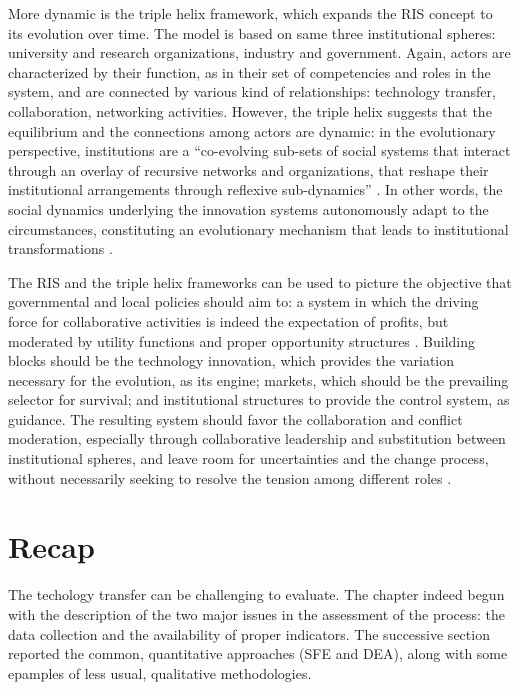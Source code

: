 More dynamic is the triple helix framework, which expands the RIS concept to its evolution over time. The model is based on same three  institutional spheres: university and research organizations, industry and government. Again, actors are characterized by their function, as in their set of competencies and roles in the system, and are connected by various kind of relationships: technology transfer, collaboration, networking activities. However, the triple helix suggests that the equilibrium and the connections among actors are dynamic: in the evolutionary perspective, institutions are a \enquote{co-evolving sub-sets of social systems that interact through an overlay of recursive networks and organizations, that reshape their institutional arrangements through reflexive sub-dynamics} \citep{Ranga2013}. In other words, the social dynamics underlying the innovation systems autonomously adapt to the circumstances, constituting an evolutionary mechanism that leads to institutional transformations \citep{Etzkowitz2000}.

The RIS and the triple helix frameworks can be used to picture the objective that governmental and local policies should aim to: a system in which the driving force for collaborative activities is indeed the expectation of profits, but moderated by utility functions and proper opportunity structures \citep{Etzkowitz2000}. Building blocks should be the technology innovation, which provides the variation necessary for the evolution, as its engine; markets, which should be the prevailing selector for survival; and institutional structures to provide the control system, as guidance. The resulting system should favor the collaboration and conflict moderation, especially through collaborative leadership and substitution between institutional spheres, and leave room for uncertainties and the change process, without necessarily seeking to resolve the tension among different roles \citep{Ranga2013}. 

\section{Recap}

The techology transfer can be challenging to evaluate. The chapter indeed begun with the description of the two major issues in the assessment of the process: the data collection and the availability of proper indicators. The successive section reported the common, quantitative approaches (SFE and DEA), along with some epamples of less usual, qualitative methodologies.

